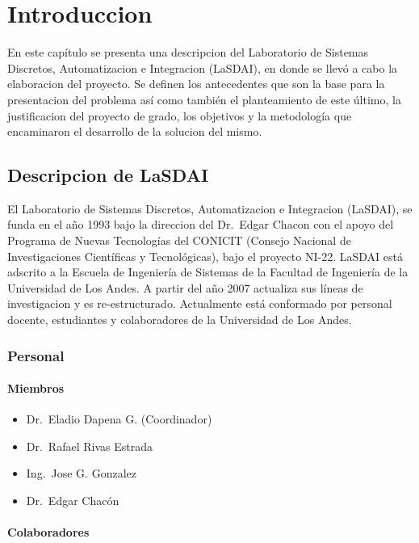 \chapter{Introduccion}

En este capítulo se presenta una descripcion del Laboratorio de Sistemas Discretos, Automatizacion e Integracion (LaSDAI), en donde se llevó a cabo la elaboracion del proyecto. Se definen los antecedentes que son la base para la presentacion del problema así como también el planteamiento de este último, la justificacion del proyecto de grado, los objetivos y la metodología que encaminaron el desarrollo de la solucion del mismo.

\section{Descripcion de LaSDAI}

El Laboratorio de Sistemas Discretos, Automatizacion e Integracion (LaSDAI), se funda en el año 1993 bajo la direccion del Dr.\ Edgar Chacon con el apoyo del Programa de Nuevas Tecnologías del CONICIT (Consejo Nacional de Investigaciones Científicas y Tecnológicas), bajo el proyecto N\textordmasculine I-22. LaSDAI está adscrito a la Escuela de Ingeniería de Sistemas de la Facultad de Ingeniería de la Universidad de Los Andes. A partir del año 2007 actualiza sus líneas de investigacion y es re-estructurado. Actualmente está conformado por personal docente, estudiantes y colaboradores de la Universidad de Los Andes.\cite{lasdaiInicio}

\subsection{Personal}

\subsubsection{Miembros}

\begin{itemize}
	\itemsep1pt \parskip0pt 
	\item Dr.\ Eladio Dapena G. (Coordinador)
	\item Dr.\ Rafael Rivas Estrada
	\item Ing.\ Jose G. Gonzalez
	\item Dr.\ Edgar Chacón
\end{itemize}

\subsubsection{Colaboradores}

